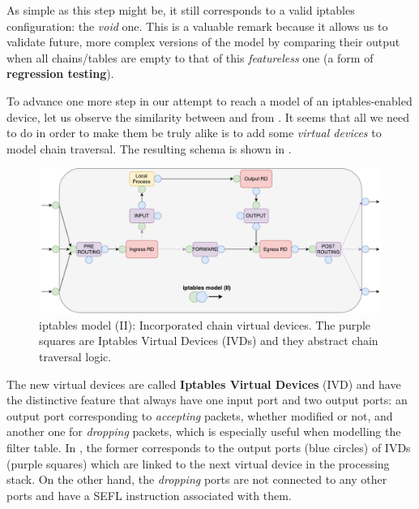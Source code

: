 As simple as this step might be, it still corresponds to a valid iptables
configuration: the \emph{void} one.  This is a valuable remark because it
allows us to validate future, more complex versions of the model by comparing
their output when all chains/tables are empty to that of this
\emph{featureless} one (a form of \textbf{regression testing}).

\bigskip

To advance one more step in our attempt to reach a model of an iptables-enabled
device, let us observe the similarity between
 and
 from
.  It seems that all we need to do
in order to make them be truly alike is to add some \emph{virtual devices} to
model chain traversal. The resulting schema is shown in
.

\begin{figure}[h]
  \centering
  \captionsetup{justification=centering}
  \includegraphics[scale=0.45]{src/img/iptables-2}
  \caption[iptables model (II): Incorporated chain virtual devices.]{iptables
  model (II): Incorporated chain virtual devices.  The purple squares are
  Iptables Virtual Devices (IVDs) and they abstract chain traversal logic.}
  \label{fig:iptables-2}
\end{figure}

The new virtual devices are called \textbf{Iptables Virtual Devices}
(IVD) and have the distinctive feature
that always have one input port and two output ports: an output port
corresponding to \emph{accepting} packets, whether modified or not, and another
one for \emph{dropping} packets, which is especially useful when modelling the
filter table.  In , the former
corresponds to the output ports (blue circles) of IVDs (purple squares) which
are linked to the next virtual device in the processing stack.  On the other
hand, the \emph{dropping} ports are not connected to any other ports and have a
SEFL  instruction associated with them.

